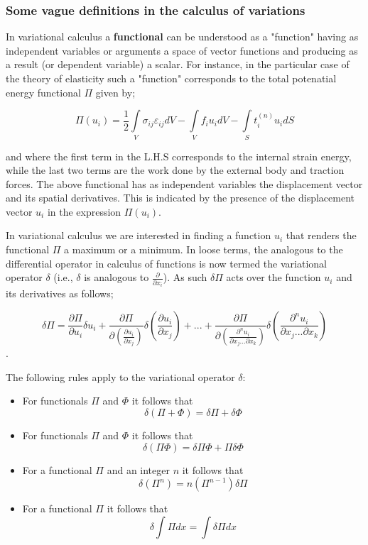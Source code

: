 \subsubsection*{Some vague definitions in the calculus of variations}
In variational calculus a {\bf functional} can be understood as a "function" having as independent variables or arguments a space of vector functions and producing as a result (or dependent variable) a scalar. For instance, in the particular case of the theory of elasticity such a "function" corresponds to the total potenatial energy functional $\Pi$ given by;

\begin{equation}
\Pi ({u_i}) = \frac{1}{2}\int\limits_V {{\sigma _{ij}}{\varepsilon _{ij}}dV}  - \int\limits_V {{f_i}{u_i}dV}  - \int\limits_S {t_i^{(n)}{u_i}dS}
\label{Potential}
\end{equation}

and where the first term in the L.H.S corresponds to the internal strain energy, while the last two terms are the work done by the external body and traction forces. The above functional has as independent variables the displacement vector and its spatial derivatives. This is indicated by the presence of the displacement vector $u_i$ in the expression $\Pi(u_i)$.

In variational calculus we are interested in finding a function $u_i$ that renders the functional $\Pi$ a maximum or a minimum. In loose terms, the analogous to the differential operator in calculus of functions is now termed the variational operator $\delta$ (i.e., $\delta$ is analogous to $\frac{\partial }{{\partial {x_i}}}$). As such $\delta\Pi$ acts over the function $u_i$ and its derivatives as follows;

\[\delta \Pi  = \frac{{\partial \Pi }}{{\partial {u_i}}}\delta {u_i} + \frac{{\partial \Pi }}{{\partial \left( {\frac{{\partial {u_i}}}{{\partial {x_j}}}} \right)}}\delta \left( {\frac{{\partial {u_i}}}{{\partial {x_j}}}} \right) + ... + \frac{{\partial \Pi }}{{\partial \left( {\frac{{{\partial ^n}{u_i}}}{{\partial {x_j}...\partial {x_k}}}} \right)}}\delta \left( {\frac{{{\partial ^n}{u_i}}}{{\partial {x_j}...\partial {x_k}}}} \right)\].

The following rules apply to the variational operator $\delta$:

\begin{itemize}
\item For functionals $\Pi$ and $\Phi$ it follows that \[\delta (\Pi  + \Phi ) = \delta \Pi  + \delta \Phi \]
\item For functionals $\Pi$ and $\Phi$ it follows that \[\delta (\Pi \Phi ) = \delta \Pi \Phi  + \Pi \delta \Phi \]
\item For a functional $\Pi$ and an integer $n$ it follows that \[\delta ({\Pi ^n}) = n({\Pi ^{n - 1}})\delta \Pi \]
\item For a functional $\Pi$ it follows that \[\delta \int {\Pi dx}  = \int {\delta \Pi dx} \]
\end{itemize}

